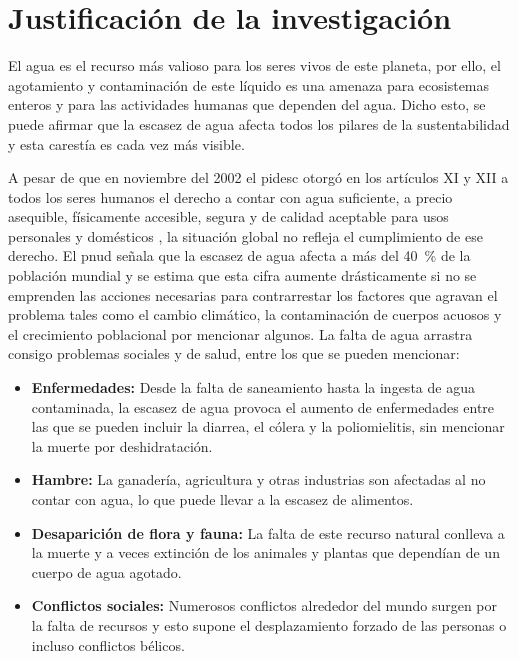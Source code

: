 \chapter{Justificación de la investigación}

	El agua es el recurso más valioso para los seres vivos de este planeta, por ello, el agotamiento y contaminación de este líquido es una amenaza para ecosistemas enteros y para las actividades humanas que dependen del agua. Dicho esto, se puede afirmar que la escasez de agua afecta todos los pilares de la sustentabilidad y esta carestía es cada vez más visible.
	
	A pesar de que en noviembre del 2002 el \acrfull{pidesc} otorgó en los artículos XI y XII a todos los seres humanos el derecho a contar con agua suficiente, a precio asequible, físicamente accesible, segura y de calidad aceptable para usos personales y domésticos \cite{fondo_para_la_comunicacion_y_la_educacion_ambiental_derecho_nodate}, la situación global no refleja el cumplimiento de ese derecho. El \acrfull{pnud} señala que la escasez de agua afecta a más del \qty{40}{\percent} de la población mundial \cite{pnud_objetivo_nodate} y se estima que esta cifra aumente drásticamente si no se emprenden las acciones necesarias para contrarrestar los factores que agravan el problema tales como el cambio climático, la contaminación de cuerpos acuosos y el crecimiento poblacional por mencionar algunos. La falta de agua arrastra consigo problemas sociales y de salud, entre los que se pueden mencionar:
		
	\begin{itemize}[columns=2]
		\item \textbf{Enfermedades:} Desde la falta de saneamiento hasta la ingesta de agua contaminada, la escasez de agua provoca el aumento de enfermedades entre las que se pueden incluir la diarrea, el cólera y la poliomielitis, sin mencionar la muerte por deshidratación.
		\item \textbf{Hambre:} La ganadería, agricultura y otras industrias son afectadas al no contar con agua, lo que puede llevar a la escasez de alimentos.
		\item \textbf{Desaparición de flora y fauna:} La falta de este recurso natural conlleva a la muerte y a veces extinción de los animales y plantas que dependían de un cuerpo de agua agotado.
		\item \textbf{Conflictos sociales:} Numerosos conflictos alrededor del mundo surgen por la falta de recursos y esto supone el desplazamiento forzado de las personas o incluso conflictos bélicos.
	\end{itemize}
	
